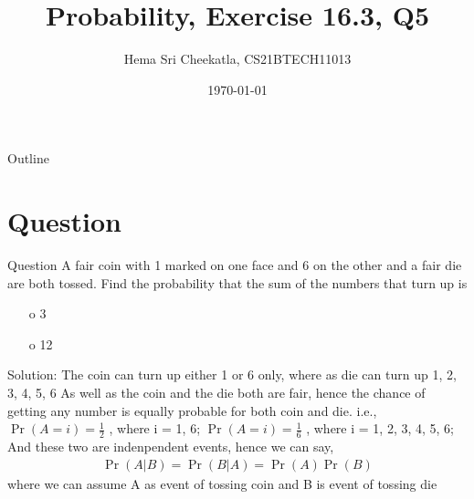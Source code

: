 \documentclass{beamer}
\title{Probability, Exercise 16.3, Q5}
\author{Hema Sri Cheekatla, CS21BTECH11013}
\date{\today}
\providecommand{\pr}[1]{\ensuremath{\Pr\left(#1\right)}}
\begin{document}
\begin{frame}
    \titlepage 
\end{frame}

\logo{}


\begin{frame}{Outline}
    \tableofcontents
\end{frame}


\section{Question}
\begin{frame}{Question}
A fair coin with 1 marked on one face and 6 on the other and a fair die are both tossed. Find the probability that the sum of the numbers that turn up is 
\begin{itemize}
    \item[o] 3
    \item[o] 12
\end{itemize}

\end{frame}

\begin{frame}{Solution:}
The coin can turn up either 1 or 6 only, where as die can turn up 1, 2, 3, 4, 5, 6\newline
As well as the coin and the die both are fair, hence the chance of getting any number is equally probable for both coin and die.\newline
i.e., \newline
$ \pr{A = i} = \frac{1}{2} $ , where i = 1, 6; \newline
$ \pr{A = i} = \frac{1}{6} $ , where i = 1, 2, 3, 4, 5, 6; \newline
And these two are indenpendent events, hence we can say,
\begin{align*}
	\pr{A|B} = \pr{B|A} = \pr{A}\pr{B}
\end{align*}
where we can assume A as event of tossing coin and B is event of tossing die \newline
\end{frame}
\end{document}
